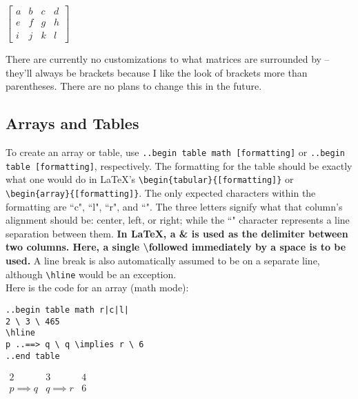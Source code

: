 \documentclass[12pt]{article}
\begin{document}
\begin{flushleft}
\medskip

$\begin{bmatrix}
a & b & c & d \\
e & f & g & h \\
i & j & k & l 
\end{bmatrix}$

\medskip

There are currently no customizations to what matrices are surrounded by -- they'll always be brackets because I like the look of brackets more than parentheses. There are no plans to change this in the future.

\newpage

\subsection*{Arrays and Tables}

To create an array or table, use \verb|..begin table math [formatting]| or \verb|..begin table [formatting]|, respectively. The formatting for the table should be exactly what one would do in LaTeX's \verb|\begin{tabular}{[formatting]}| or \verb|\begin{array}{[formatting]}|. The only expected characters within the formatting are ``c", ``l", ``r", and ``\textbar". The three letters signify what that column's alignment should be: center, left, or right; while the ``\textbar" character represents a line separation between them. \textbf{In LaTeX, a \& is used as the delimiter between two columns. Here, a single \textbackslash followed immediately by a space is to be used.} A line break is also automatically assumed to be on a separate line, although \verb|\hline| would be an exception. \\
\medskip
Here is the code for an array (math mode): \\

\medskip

\verb=..begin table math r|c|l|= \\
\verb|2 \ 3 \ 465| \\
\verb|\hline| \\
\verb|p |\verb|..==> q \ q \implies r \ 6| \\
\verb|..end table|

\bigskip

$\begin{array}{r|c|l|}
2 & 3 & 4 \\
\hline
p \implies q & q \implies r & 6 
\end{array}$


\end{flushleft}
\end{document}
